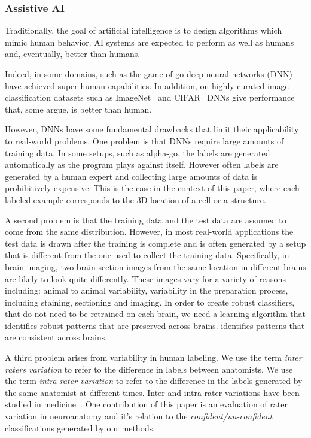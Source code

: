 \documentclass[11pt]{article}
\begin{document}
\subsubsection{Assistive AI} Traditionally, the goal of artificial
  intelligence is to design algorithms which mimic human behavior. AI
  systems are expected to perform as well as humans and, eventually,
  better than humans.

Indeed, in some domains, such as the game of go \cite{silver2017mastering} deep neural
networks (DNN)  have achieved super-human capabilities. In addition,
on highly curated image classification datasets such as ImageNet~\cite{deng2009imagenet} and
CIFAR~\cite{krizhevsky2009learning} DNNs give performance that, some argue, is better than
human. 

However, DNNs have some fundamental drawbacks that limit their
applicability to real-world problems. One problem is that DNNs
require large amounts of training data.
In some setups, such as alpha-go, the labels are generated automatically as
the program plays against itself. However often labels are generated by a
human expert and collecting large amounts of data is
prohibitively expensive. This is the case in the context of this
paper, where each labeled example corresponds to the 3D location of a
cell or a structure.

A second problem is that the training data and the test data are assumed to
come from the same distribution. However, in most real-world
applications the test data is drawn after the training is complete and
is often generated by a setup that is different from the one used to
collect the training data.
Specifically, in brain imaging, two brain section images from the same
location in different brains are likely to look quite differently.
These images vary for a variety of reasons including: animal to animal variability,
variability in the preparation process, including staining,
sectioning and imaging. In order to create robust classifiers, that do
not need to be retrained on each brain, we need a learning algorithm
that identifies robust patterns that are preserved across brains.
identifies patterns that are consistent across brains.

A third problem arises from variability in human labeling. We use
the term {\em inter raters variation} to refer to the difference in
labels between anatomists. We use the term {\em intra rater
  variation} to refer to the difference in the labels generated by the
same anatomist at different times. Inter and intra rater variations
have been studied in medicine~\cite{gellhorn2013inter}. One
contribution of this paper is an evaluation of rater variation in
neuroanatomy and it's relation to the {\em confident/un-confident}
classifications generated by our methods.
\end{document}
